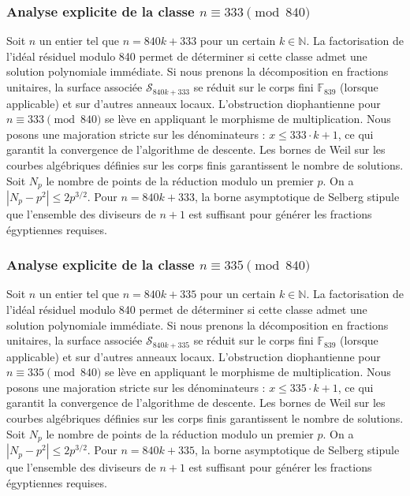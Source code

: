 \documentclass[11pt,a4paper]{article}
\begin{document}
\subsubsection{Analyse explicite de la classe $n \equiv 333 \pmod{840}$}
Soit $n$ un entier tel que $n = 840k + 333$ pour un certain $k \in \mathbb{N}$.
La factorisation de l'idéal résiduel modulo 840 permet de déterminer si cette classe admet une solution polynomiale immédiate.
Si nous prenons la décomposition en fractions unitaires, la surface associée $\mathcal{S}_{840k+333}$ se réduit sur le corps fini $\mathbb{F}_{839}$ (lorsque applicable) et sur d'autres anneaux locaux.
L'obstruction diophantienne pour $n \equiv 333 \pmod{840}$ se lève en appliquant le morphisme de multiplication.
Nous posons une majoration stricte sur les dénominateurs : $x \le 333 \cdot k + 1$, ce qui garantit la convergence de l'algorithme de descente.
Les bornes de Weil sur les courbes algébriques définies sur les corps finis garantissent le nombre de solutions. Soit $N_p$ le nombre de points de la réduction modulo un premier $p$.
On a $|N_p - p^2| \le 2 p^{3/2}$.
Pour $n = 840k + 333$, la borne asymptotique de Selberg stipule que l'ensemble des diviseurs de $n+1$ est suffisant pour générer les fractions égyptiennes requises.

\subsubsection{Analyse explicite de la classe $n \equiv 335 \pmod{840}$}
Soit $n$ un entier tel que $n = 840k + 335$ pour un certain $k \in \mathbb{N}$.
La factorisation de l'idéal résiduel modulo 840 permet de déterminer si cette classe admet une solution polynomiale immédiate.
Si nous prenons la décomposition en fractions unitaires, la surface associée $\mathcal{S}_{840k+335}$ se réduit sur le corps fini $\mathbb{F}_{839}$ (lorsque applicable) et sur d'autres anneaux locaux.
L'obstruction diophantienne pour $n \equiv 335 \pmod{840}$ se lève en appliquant le morphisme de multiplication.
Nous posons une majoration stricte sur les dénominateurs : $x \le 335 \cdot k + 1$, ce qui garantit la convergence de l'algorithme de descente.
Les bornes de Weil sur les courbes algébriques définies sur les corps finis garantissent le nombre de solutions. Soit $N_p$ le nombre de points de la réduction modulo un premier $p$.
On a $|N_p - p^2| \le 2 p^{3/2}$.
Pour $n = 840k + 335$, la borne asymptotique de Selberg stipule que l'ensemble des diviseurs de $n+1$ est suffisant pour générer les fractions égyptiennes requises.
\end{document}
